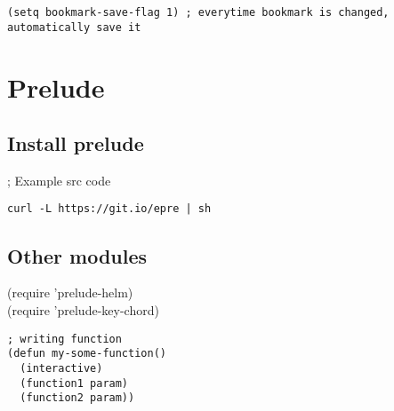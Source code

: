 \documentclass[11pt]{article}
\begin{document}
\begin{verbatim}
(setq bookmark-save-flag 1) ; everytime bookmark is changed, automatically save it
\end{verbatim}

\section{Prelude}
\label{sec:orgbaa703f}
\subsection{Install prelude}
\label{sec:org6fb2a20}
; Example src code\\
\begin{verbatim}
curl -L https://git.io/epre | sh
\end{verbatim}
\subsection{Other modules}
\label{sec:org6ea51b5}
(require 'prelude-helm)\\
(require 'prelude-key-chord)\\

\begin{verbatim}
; writing function
(defun my-some-function()
  (interactive)
  (function1 param)
  (function2 param))
\end{verbatim}
\end{document}
